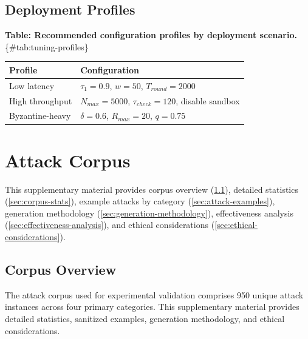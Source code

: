 \documentclass[
]{article}
\newcounter{none} %
\begin{document}
\subsection{Deployment Profiles}\label{sec:tuning-profiles}

\textbf{Table: Recommended configuration profiles by deployment
scenario.} \{\#tab:tuning-profiles\}

{\def\LTcaptype{none} %
\begin{longtable}[]{@{}
  >{\raggedright\arraybackslash}p{}
  >{\raggedright\arraybackslash}p{}@{}}
\toprule\noalign{}
\begin{minipage}[b]{\linewidth}\raggedright
Profile
\end{minipage} & \begin{minipage}[b]{\linewidth}\raggedright
Configuration
\end{minipage} \\
\midrule\noalign{}
\endhead
\bottomrule\noalign{}
\endlastfoot
Low latency & \(\tau_1 = 0.9\), \(w = 50\), \(T_{round} = 2000\) \\
High throughput & \(N_{max} = 5000\), \(\tau_{check} = 120\), disable
sandbox \\
Byzantine-heavy & \(\delta = 0.6\), \(R_{max} = 20\), \(q = 0.75\) \\
\end{longtable}
}

\newpage

\newpage

\section{Attack Corpus}\label{sec:attack-corpus}

This supplementary material provides corpus overview
(\cref{sec:corpus-overview}), detailed statistics
(\cref{sec:corpus-stats}), example attacks by category
(\cref{sec:attack-examples}), generation methodology
(\cref{sec:generation-methodology}), effectiveness analysis
(\cref{sec:effectiveness-analysis}), and ethical considerations
(\cref{sec:ethical-considerations}).

\subsection{Corpus Overview}\label{sec:corpus-overview}

The attack corpus used for experimental validation comprises 950 unique
attack instances across four primary categories. This supplementary
material provides detailed statistics, sanitized examples, generation
methodology, and ethical considerations.
\end{document}
